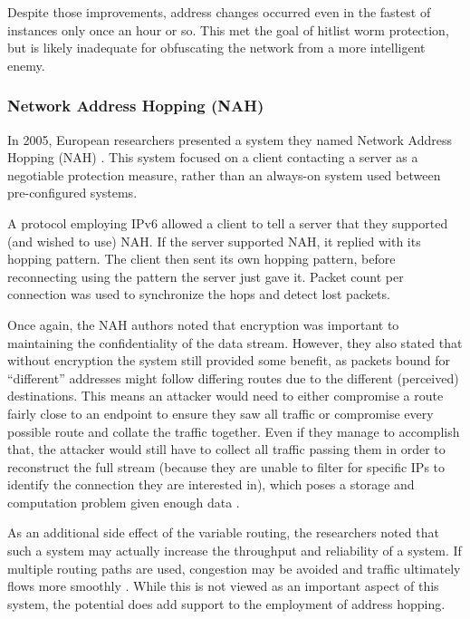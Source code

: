 \par Despite those improvements, address changes occurred even in the fastest of instances only once an hour or so. This met the goal of hitlist worm protection, but is likely inadequate for obfuscating the network from a more intelligent enemy.

\subsubsection{Network Address Hopping (NAH)}
\par In 2005, European researchers presented a system they named Network Address Hopping (NAH) \cite{NAH}. This system focused on a client contacting a server as a negotiable protection measure, rather than an always-on system used between pre-configured systems.

\par A protocol employing IPv6 allowed a client to tell a server that they supported (and wished to use) NAH. If the server supported NAH, it replied with its hopping pattern. The client then sent its own hopping pattern, before reconnecting using the pattern the server just gave it. Packet count per connection was used to synchronize the hops and detect lost packets.

\par Once again, the NAH authors noted that encryption was important to maintaining the confidentiality of the data stream. However, they also stated that without encryption the system still provided some benefit, as packets bound for ``different'' addresses might follow differing routes due to the different (perceived) destinations. This means an attacker would need to either compromise a route fairly close to an endpoint to ensure they saw all traffic or compromise every possible route and collate the traffic together. Even if they manage to accomplish that, the attacker would still have to collect all traffic passing them in order to reconstruct the full stream (because they are unable to filter for specific IPs to identify the connection they are interested in), which poses a storage and computation problem given enough data \cite{NAH}.

\par As an additional side effect of the variable routing, the researchers noted that such a system may actually increase the throughput and reliability of a system. If multiple routing paths are used, congestion may be avoided and traffic ultimately flows more smoothly \cite{MultimediaDistributed}. While this is not viewed as an important aspect of this system, the potential does add support to the employment of address hopping.

